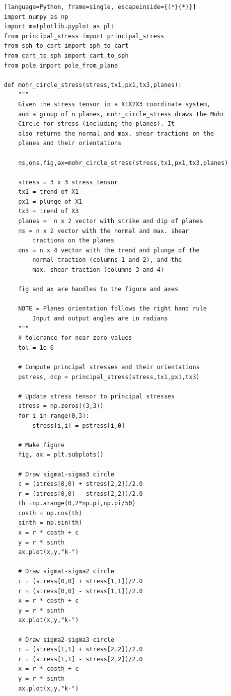 \documentclass[a4paper , 12pt]{book}
\begin{document}
\begin{center}
\begin{lstlisting}[language=Python, frame=single, escapeinside={(*}{*)}]
import numpy as np
import matplotlib.pyplot as plt
from principal_stress import principal_stress
from sph_to_cart import sph_to_cart
from cart_to_sph import cart_to_sph
from pole import pole_from_plane

def mohr_circle_stress(stress,tx1,px1,tx3,planes):
	"""
	Given the stress tensor in a X1X2X3 coordinate system,
	and a group of n planes, mohr_circle_stress draws the Mohr
	Circle for stress (including the planes). It
	also returns the normal and max. shear tractions on the
	planes and their orientations
	
	ns,ons,fig,ax=mohr_circle_stress(stress,tx1,px1,tx3,planes)
	
	stress = 3 x 3 stress tensor
	tx1 = trend of X1
	px1 = plunge of X1
	tx3 = trend of X3
	planes =  n x 2 vector with strike and dip of planes
	ns = n x 2 vector with the normal and max. shear
		tractions on the planes
	ons = n x 4 vector with the trend and plunge of the
		normal traction (columns 1 and 2), and the
		max. shear traction (columns 3 and 4)
		
	fig and ax are handles to the figure and axes
	
	NOTE = Planes orientation follows the right hand rule
		Input and output angles are in radians
	"""
	# tolerance for near zero values
	tol = 1e-6
	
	# Compute principal stresses and their orientations
	pstress, dcp = principal_stress(stress,tx1,px1,tx3)
	
	# Update stress tensor to principal stresses
	stress = np.zeros((3,3))
	for i in range(0,3):
		stress[i,i] = pstress[i,0]
	
	# Make figure
	fig, ax = plt.subplots()
	
	# Draw sigma1-sigma3 circle
	c = (stress[0,0] + stress[2,2])/2.0
	r = (stress[0,0] - stress[2,2])/2.0
	th =np.arange(0,2*np.pi,np.pi/50)
	costh = np.cos(th)
	sinth = np.sin(th)
	x = r * costh + c
	y = r * sinth
	ax.plot(x,y,"k-")
	
	# Draw sigma1-sigma2 circle
	c = (stress[0,0] + stress[1,1])/2.0
	r = (stress[0,0] - stress[1,1])/2.0
	x = r * costh + c
	y = r * sinth
	ax.plot(x,y,"k-")
	
	# Draw sigma2-sigma3 circle
	c = (stress[1,1] + stress[2,2])/2.0
	r = (stress[1,1] - stress[2,2])/2.0
	x = r * costh + c
	y = r * sinth
	ax.plot(x,y,"k-")
	

\end{lstlisting}
\end{center}
\end{document}
